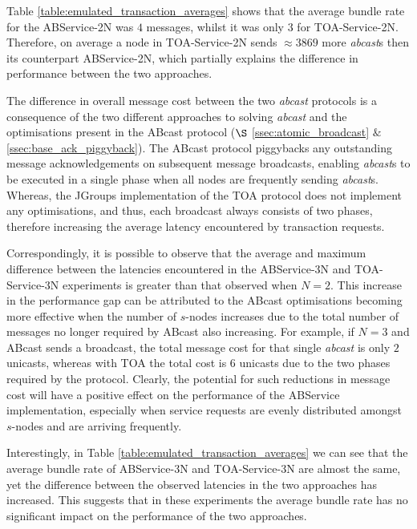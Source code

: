     Table \ref{table:emulated_transaction_averages} shows that the average bundle rate for the ABService-2N was $4$ messages, whilst it was only $3$ for TOA-Service-2N.  Therefore, on average a node in TOA-Service-2N sends $\approx 3869$ more \emph{abcast}s then its counterpart ABService-2N, which partially explains the difference in performance between the two approaches.  
    
    The difference in overall message cost between the two \emph{abcast} protocols is a consequence of the two different approaches to solving \emph{abcast} and the optimisations present in the \textsf{ABcast} protocol ($\S$  \ref{ssec:atomic_broadcast} $\&$ \ref{ssec:base_ack_piggyback}).  The \textsf{ABcast} protocol piggybacks any outstanding message acknowledgements on subsequent message broadcasts, enabling \emph{abcast}s to be executed in a single phase when all nodes are frequently sending \emph{abcast}s.  Whereas, the JGroups implementation of the TOA protocol does not implement any optimisations, and thus, each broadcast always consists of two phases, therefore increasing the average latency encountered by transaction requests.  
	
	Correspondingly, it is possible to observe that the average and maximum difference between the latencies encountered in the ABService-3N and TOA-Service-3N experiments is greater than that observed when $N = 2$.  This increase in the performance gap can be attributed to the \textsf{ABcast} optimisations becoming more effective when the number of $s$-nodes increases due to the total number of messages no longer required by \textsf{ABcast} also increasing.  For example, if $N = 3$ and \textsf{ABcast} sends a broadcast, the total message cost for that single \emph{abcast} is only $2$ unicasts, whereas with TOA the total cost is $6$ unicasts due to the two phases required by the protocol.  Clearly, the potential for such reductions in message cost will have a positive effect on the performance of the ABService implementation, especially when service requests are evenly distributed amongst $s$-nodes and are arriving frequently.  
	
    Interestingly, in Table \ref{table:emulated_transaction_averages} we can see that the average bundle rate of ABService-3N and TOA-Service-3N are almost the same, yet the difference between the observed latencies in the two approaches has increased.  	This suggests that in these experiments the average bundle rate has no significant impact on the performance of the two approaches.  
    
